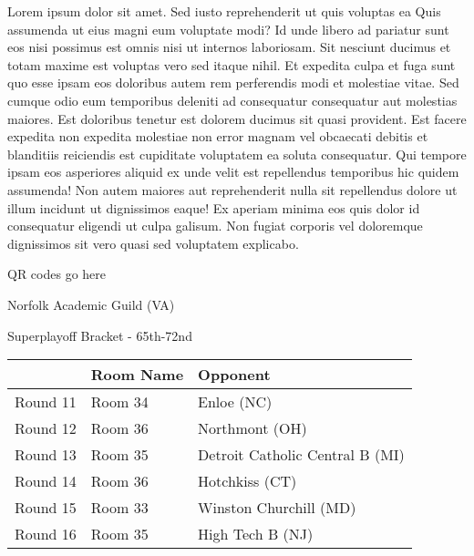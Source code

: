 \documentclass{article}%
\begin{document}
\vspace*{8pt}%
\linebreak%
\newline%
\newline%
    Lorem ipsum dolor sit amet. Sed iusto reprehenderit ut quis voluptas ea Quis assumenda ut eius magni eum voluptate modi? Id unde libero ad pariatur sunt eos nisi possimus est omnis nisi ut internos laboriosam. Sit nesciunt ducimus et totam maxime est voluptas vero sed itaque nihil. Et expedita culpa et fuga sunt quo esse ipsam eos doloribus autem rem perferendis modi et molestiae vitae.\newline%
\newline%
    Sed cumque odio eum temporibus deleniti ad consequatur consequatur aut molestias maiores. Est doloribus tenetur est dolorem ducimus sit quasi provident. Est facere expedita non expedita molestiae non error magnam vel obcaecati debitis et blanditiis reiciendis est cupiditate voluptatem ea soluta consequatur. Qui tempore ipsam eos asperiores aliquid ex unde velit est repellendus temporibus hic quidem assumenda!\newline%
\newline%
    Non autem maiores aut reprehenderit nulla sit repellendus dolore ut illum incidunt ut dignissimos eaque! Ex aperiam minima eos quis dolor id consequatur eligendi ut culpa galisum. Non fugiat corporis vel doloremque dignissimos sit vero quasi sed voluptatem explicabo.\newline%
\newline%
\vspace*{30pt}%
\begin{center}%
\begin{Huge}%
QR codes go here%
\end{Huge}%
\end{center}%
\newpage%
\begin{center}%
\begin{Huge}%
Norfolk Academic Guild (VA)%
\end{Huge}%
\vspace*{8pt}%
\linebreak%
\begin{Large}%
Superplayoff Bracket {-} 65th{-}72nd%
\end{Large}%
\end{center}%
%
\begin{tabularx}{\textwidth}{|c|Y|Y|}%
\hline%
&Room Name&Opponent\\%
\hline%
Round 11&Room 34&Enloe (NC)\\%
Round 12&Room 36&Northmont (OH)\\%
Round 13&Room 35&Detroit Catholic Central B (MI)\\%
Round 14&Room 36&Hotchkiss (CT)\\%
Round 15&Room 33&Winston Churchill (MD)\\%
Round 16&Room 35&High Tech B (NJ)\\%
\hline%
\end{tabularx}%
\end{document}
